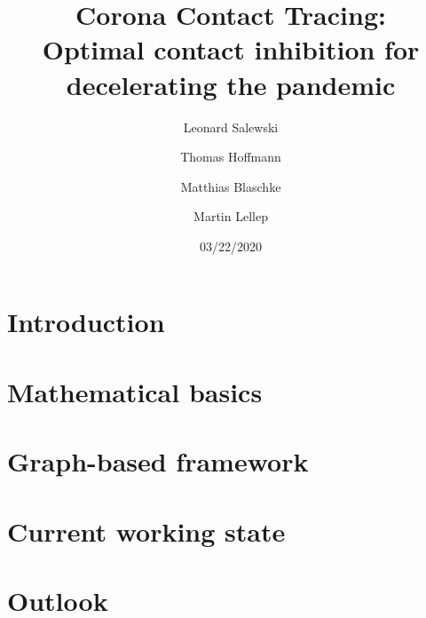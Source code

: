\documentclass[%
 reprint,
 amsmath,amssymb,showkeys,
 aps,
]{revtex4-1}
\begin{document}
\title{Corona Contact Tracing:\\Optimal contact inhibition for decelerating the pandemic}

\author{Leonard Salewski}
\author{Thomas Hoffmann}
\author{Matthias Blaschke}
\author{Martin Lellep}

\date{03/22/2020}




\maketitle

\section{\label{sec:introcution}Introduction}



\section{\label{sec:basics}Mathematical basics}



\section{\label{sec:framework}Graph-based framework}



\section{\label{sec:working_state}Current working state}



\section{\label{sec:outlook}Outlook}





\end{document}
